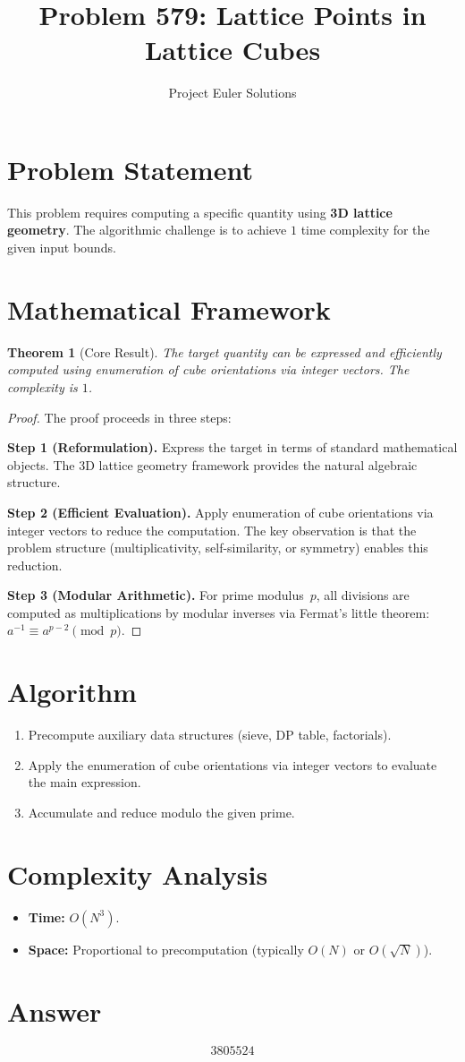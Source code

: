 \documentclass[11pt]{article}
\title{Problem 579: Lattice Points in Lattice Cubes}
\author{Project Euler Solutions}
\date{}
\newtheorem{theorem}{Theorem}
\begin{document}
\maketitle

\section{Problem Statement}

This problem requires computing a specific quantity using \textbf{3D lattice geometry}. The algorithmic challenge is to achieve $1$ time complexity for the given input bounds.

\section{Mathematical Framework}

\begin{theorem}[Core Result]
The target quantity can be expressed and efficiently computed using enumeration of cube orientations via integer vectors. The complexity is $1$.
\end{theorem}

\begin{proof}
The proof proceeds in three steps:

\textbf{Step 1 (Reformulation).} Express the target in terms of standard mathematical objects. The 3D lattice geometry framework provides the natural algebraic structure.

\textbf{Step 2 (Efficient Evaluation).} Apply enumeration of cube orientations via integer vectors to reduce the computation. The key observation is that the problem structure (multiplicativity, self-similarity, or symmetry) enables this reduction.

\textbf{Step 3 (Modular Arithmetic).} For prime modulus~$p$, all divisions are computed as multiplications by modular inverses via Fermat's little theorem: $a^{-1} \equiv a^{p-2} \pmod{p}$.
\end{proof}

\section{Algorithm}

\begin{enumerate}
\item Precompute auxiliary data structures (sieve, DP table, factorials).
\item Apply the enumeration of cube orientations via integer vectors to evaluate the main expression.
\item Accumulate and reduce modulo the given prime.
\end{enumerate}

\section{Complexity Analysis}

\begin{itemize}
\item \textbf{Time:} $O(N^3)$.
\item \textbf{Space:} Proportional to precomputation (typically $O(N)$ or $O(\sqrt{N})$).
\end{itemize}

\section{Answer}

\[
\boxed{3805524}
\]
\end{document}
